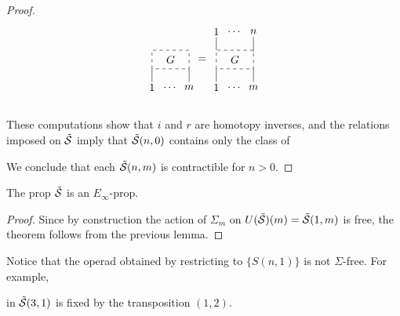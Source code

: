 \begin{proof}
\begin{equation*}
{\begin{tikzpicture}[scale=.6]
		\draw [dashed] (0,0) rectangle (2,1); \node at (1, .5) {$G$};
		
		\node at (0,-1) {$1$}; \draw (0,-.7) -- (0,0);
		\node at (1,-1) {$\dots$};
		\node at (2,-1) {$m$}; \draw (2,-.7) -- (2,0);
		\node at (2.7,.5) {$=$}; 
		\end{tikzpicture}
		\begin{tikzpicture}[scale=.6]
		\node at (0,2) {$1$}; \draw (0,1.7) -- (0,1);
		\node at (1,2) {$\dots$};
		\node at (2,2) {$n$}; \draw (2,1.7) -- (2,.9);
		
		\draw [dashed] (0,0) rectangle (2,1); \node at (1, .5) {$G$};
		
		\node at (0,-1) {$1$}; \draw (0,-.7) -- (0,0);
		\node at (1,-1) {$\dots$};
		\node at (2,-1) {$m$}; \draw (2,-.7) -- (2,0);
		\end{tikzpicture}
	}\end{equation*}\\
	These computations show that $i$ and $r$ are homotopy inverses, and the relations imposed on $\tilde{\S}$ imply that $\tilde{\S}(n,0)$ contains only the class of \vspace*{-7pt}
	\begin{center}
	\end{center}\vspace*{-7pt}
	We conclude that each $\tilde{\S}(n,m)$ is contractible for $n > 0$.
\end{proof}

\begin{theorem} \label{sigma-free resolution}
	The prop $\tilde{\S}$ is an $E_\infty$-prop.
\end{theorem}

\begin{proof}
	Since by construction the action of $\Sigma_m$ on $U(\tilde{\S})(m)=\tilde{\S}(1,m)$ is free, the theorem follows from the previous lemma.
\end{proof}

\begin{remark}
	Notice that the operad obtained by restricting to $\{S(n,1)\}$ is not $\Sigma$-free. For example, 
	\begin{center}
	\end{center}
	in $\tilde{\S}(3,1)$ is fixed by the transposition $(1,2)$.
\end{remark}

